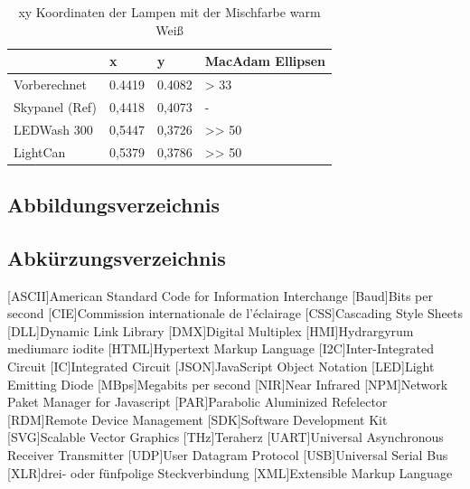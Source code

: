 \documentclass[11pt]{scrartcl}
\begin{document}
\noindent
\begin{table}[H]
    \begin{tabularx}{\textwidth}{|X|X|X|X|}
        \hline           & x        & y        & MacAdam Ellipsen\\\hline
        Vorberechnet     & 0.4419   & 0.4082   & > 33\\\hline
        Skypanel (Ref)   & 0,4418   & 0,4073   & -\\\hline
        LEDWash 300      & 0,5447   & 0,3726   & >> 50\\\hline
        LightCan         & 0,5379   & 0,3786   & >> 50\\\hline
    \end{tabularx}
    \caption{xy Koordinaten der Lampen mit der Mischfarbe warm Weiß}
\end{table}
\clearpage

\subsection{Abbildungsverzeichnis}
\begingroup
\renewcommand{\section}[2]{}
\listoffigures
\endgroup
\clearpage

\subsection{Abkürzungsverzeichnis}
\begin{acronym}
    [ASCII]{American Standard Code for Information Interchange}
    [Baud]{Bits per second}
    [CIE]{Commission internationale de l’éclairage}
    [CSS]{Cascading Style Sheets}
    [DLL]{Dynamic Link Library}
    [DMX]{Digital Multiplex}
    [HMI]{Hydrargyrum mediumarc iodite}
    [HTML]{Hypertext Markup Language}
    [I2C]{Inter-Integrated Circuit}
    [IC]{Integrated Circuit}
    [JSON]{JavaScript Object Notation}
    [LED]{Light Emitting Diode}
    [MBps]{Megabits per second}
    [NIR]{Near Infrared}
    [NPM]{Network Paket Manager for Javascript}
    [PAR]{Parabolic Aluminized Refelector}
    [RDM]{Remote Device Management}
    [SDK]{Software Development Kit}
    [SVG]{Scalable Vector Graphics}
    [THz]{Teraherz}
    [UART]{Universal Asynchronous Receiver Transmitter}
    [UDP]{User Datagram Protocol}
    [USB]{Universal Serial Bus}
    [XLR]{drei- oder fünfpolige Steckverbindung}
    [XML]{Extensible Markup Language}
\end{acronym}
\clearpage
\end{document}
